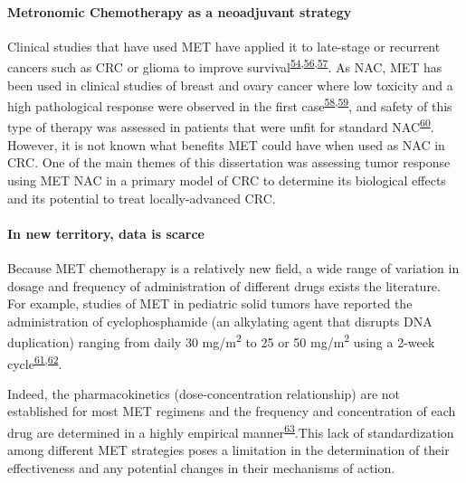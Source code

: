 \documentclass[11pt]{umnthesis}
\begin{document}
\hypertarget{metronomic-chemotherapy-as-a-neoadjuvant-strategy}{%
\paragraph{Metronomic Chemotherapy as a neoadjuvant strategy}\label{metronomic-chemotherapy-as-a-neoadjuvant-strategy}}

Clinical studies that have used MET have applied it to late-stage or recurrent cancers such as CRC or glioma to improve survival\textsuperscript{\protect\hyperlink{ref-huang2017}{54},\protect\hyperlink{ref-reardon2009}{56},\protect\hyperlink{ref-romiti2013}{57}}. As NAC, MET has been used in clinical studies of breast and ovary cancer where low toxicity and a high pathological response were observed in the first case\textsuperscript{\protect\hyperlink{ref-masuda2014}{58},\protect\hyperlink{ref-hildebrand2016}{59}}, and safety of this type of therapy was assessed in patients that were unfit for standard NAC\textsuperscript{\protect\hyperlink{ref-dessai2016}{60}}.
However, it is not known what benefits MET could have when used as NAC in CRC. One of the main themes of this dissertation was assessing tumor response using MET NAC in a primary model of CRC to determine its biological effects and its potential to treat locally-advanced CRC.

\hypertarget{in-new-territory-data-is-scarce}{%
\paragraph{In new territory, data is scarce}\label{in-new-territory-data-is-scarce}}

Because MET chemotherapy is a relatively new field, a wide range of variation in dosage and frequency of administration of different drugs exists the literature. For example, studies of MET in pediatric solid tumors have reported the administration of cyclophosphamide (an alkylating agent that disrupts DNA duplication) ranging from daily 30 mg/m\textsuperscript{2} to 25 or 50 mg/m\textsuperscript{2} using a 2-week cycle\textsuperscript{\protect\hyperlink{ref-stempak2006}{61},\protect\hyperlink{ref-kumarage2020}{62}}.

Indeed, the pharmacokinetics (dose-concentration relationship) are not established for most MET regimens and the frequency and concentration of each drug are determined in a highly empirical manner\textsuperscript{\protect\hyperlink{ref-bocci2016}{63}}.This lack of standardization among different MET strategies poses a limitation in the determination of their effectiveness and any potential changes in their mechanisms of action.
\end{document}
